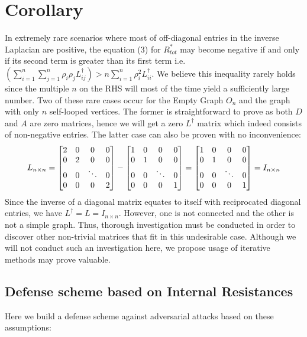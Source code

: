 \documentclass{article}
\begin{document}
	\section*{Corollary}
	In extremely rare scenarios where most of off-diagonal entries in the inverse Laplacian are positive, the equation (3) for $R^{\ast}_{tot}$ may become negative if and only if its second term is greater than its first term i.e. $\left( \sum_{i=1}^{n}\sum_{j=1}^{n} \rho_i\rho_j L_{ij}^{\dag} \right)> n\sum_{i=1}^{n} \rho_i^{2}L_{ii}^{\dag}$. We believe this inequality rarely holds since the multiple $n$ on the RHS will most of the time yield a sufficiently large number. Two of these rare cases occur for the Empty Graph $O_n$ and the graph with only $n$ self-looped vertices. The former is straightforward to prove as both $D$ and $A$ are zero matrices, hence we will get a zero $L^{\dag}$ matrix which indeed consists of non-negative entries. The latter case can also be proven with no inconvenience:
	\begin{equation*}
		L_{n\times n}=
		\begin{bmatrix}
			2 & 0 & 0 & 0 \cr
			0 & 2 & 0 & 0 \cr
			0 & 0 & \ddots & 0 \cr
			0 & 0 & 0 & 2
		\end{bmatrix}
		 -
		\begin{bmatrix}
			1 & 0 & 0 & 0 \cr
			0 & 1 & 0 & 0 \cr
			0 & 0 & \ddots & 0 \cr
			0 & 0 & 0 & 1
		\end{bmatrix}
		=
		\begin{bmatrix}
			1 & 0 & 0 & 0 \cr
			0 & 1 & 0 & 0 \cr
			0 & 0 & \ddots & 0 \cr
			0 & 0 & 0 & 1
		\end{bmatrix} = I_{n\times n}
	\end{equation*}
	Since the inverse of a diagonal matrix equates to itself with reciprocated diagonal entries, we have $L^{\dag}=L=I_{n\times n}$. However, one is not connected and the other is not a simple graph. Thus, thorough investigation must be conducted in order to discover other non-trivial matrices that fit in this undesirable case. Although we will not conduct such an investigation here, we propose usage of iterative methods \cite{corderoinverse}\cite{ZAKAULLAH2014441} may prove valuable.
	
	\subsection{Defense scheme based on Internal Resistances}
	Here we build a defense scheme against adversarial attacks based on these assumptions:
	
\end{document}
